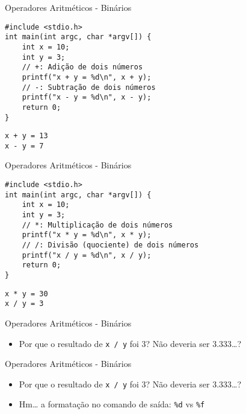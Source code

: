 \documentclass[t, aspectratio=169]{beamer}
\begin{document}
\begin{frame}[label={sec:org539d090},fragile]{Operadores Aritméticos - Binários}
 \vspace{-0.5cm}
\begin{verbatim}
#include <stdio.h>
int main(int argc, char *argv[]) {
    int x = 10;
    int y = 3;
    // +: Adição de dois números
    printf("x + y = %d\n", x + y);
    // -: Subtração de dois números
    printf("x - y = %d\n", x - y);
    return 0;
}
\end{verbatim}

\begin{verbatim}
x + y = 13
x - y = 7
\end{verbatim}
\end{frame}

\begin{frame}[label={sec:org485cf27},fragile]{Operadores Aritméticos - Binários}
 \vspace{-0.5cm}
\begin{verbatim}
#include <stdio.h>
int main(int argc, char *argv[]) {
    int x = 10;
    int y = 3;
    // *: Multiplicação de dois números
    printf("x * y = %d\n", x * y);
    // /: Divisão (quociente) de dois números
    printf("x / y = %d\n", x / y);
    return 0;
}
\end{verbatim}

\begin{verbatim}
x * y = 30
x / y = 3
\end{verbatim}
\end{frame}


\begin{frame}[label={sec:org7b8123d},fragile]{Operadores Aritméticos - Binários}
 \begin{itemize}
\item Por que o resultado de \texttt{x / y} foi 3? Não deveria ser 3.333\ldots{}?
\end{itemize}
\end{frame}

\begin{frame}[label={sec:org10d8e88},fragile]{Operadores Aritméticos - Binários}
 \begin{itemize}
\item Por que o resultado de \texttt{x / y} foi 3? Não deveria ser 3.333\ldots{}?
\item Hm\ldots{} a formatação no comando de saída: \texttt{\%d} vs \texttt{\%f}
\end{itemize}
\end{frame}
\end{document}
